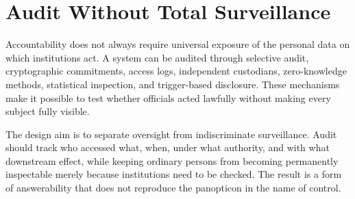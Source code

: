 
\chapter{Audit Without Total Surveillance}
\label{ch:ch103}

Accountability does not always require universal exposure of the personal data on which institutions act. A system can be audited through selective audit, cryptographic commitments, access logs, independent custodians, zero-knowledge methods, statistical inspection, and trigger-based disclosure. These mechanisms make it possible to test whether officials acted lawfully without making every subject fully visible.

The design aim is to separate oversight from indiscriminate surveillance. Audit should track who accessed what, when, under what authority, and with what downstream effect, while keeping ordinary persons from becoming permanently inspectable merely because institutions need to be checked. The result is a form of answerability that does not reproduce the panopticon in the name of control.
